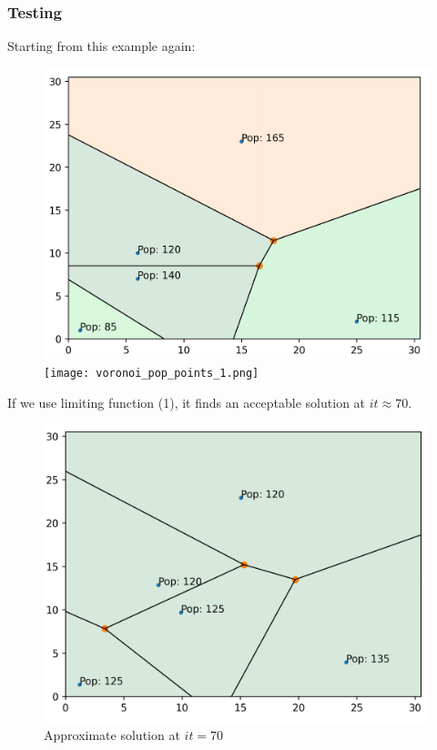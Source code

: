 \documentclass{article}
\begin{document}
\subsubsection{Testing}

Starting from this example again:

\begin{figure}[H]
    \centering 
    \hfill \includegraphics[clip,scale=0.18]{voronoi_draw_final.png}\hfill
    \texttt{[image: voronoi\_pop\_points\_1.png]}\hfill
\end{figure}

If we use limiting function (1), it finds an acceptable solution at $it \approx 70$.

\begin{figure}[H]
    \centering
    \captionsetup{justification=centering}
    \includegraphics[clip,scale=0.16]{lim1_voronoi_60.png}
    \caption*{Approximate solution at $it = 70$}
    \label{fig:lim-1-1}
\end{figure}
\end{document}
